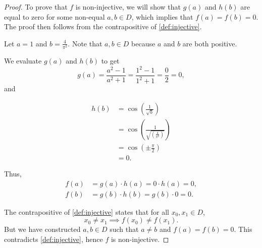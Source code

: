 \begin{enumerate}
\begin{enumerate}
\begin{proof}
                    To prove that $f$ is non-injective, we will show that $g(a)$ and $h(b)$ are equal to zero for some non-equal $a, b \in D$, which implies that $f(a) = f(b) = 0$.
                    The proof then follows from the contrapositive of \cref{def:injective}.

                    \medskip

                    Let $a = 1$ and $b = \frac{4}{\pi^2}$.
                    Note that $a, b \in D$ because $a$ and $b$ are both positive.

                    \smallskip

                    We evaluate $g(a)$ and $h(b)$ to get
                    \[
                        g(a) = \frac{a^2 - 1}{a^2 + 1} = \frac{1^2 - 1}{1^2 + 1} = \frac{0}{2} = 0,
                    \]
                    and
                    \begin{spreadlines}{\baselineskip}
                        \begin{align*}
                            h(b) &= \cos\left(\frac{1}{\sqrt{b}}\right) \\
                            &= \cos\left(\frac{1}{\sqrt{\left(\frac{4}{\pi^2}\right)}}\right) \\
                            &= \cos\left(\pm \frac{\pi}{2}\right) \\
                            &= 0.
                        \end{align*}
                    \end{spreadlines}
                    Thus,
                    \begin{align*}
                        f(a) &= g(a) \cdot h(a) = 0 \cdot h(a) = 0, \\
                        f(b) &= g(b) \cdot h(b) = g(b) \cdot 0 = 0.
                    \end{align*}

                    \smallskip

                    The contrapositive of \cref{def:injective} states that for all $x_0, x_1 \in D$,
                    \[
                        x_0 \ne x_1 \implies f(x_0) \ne f(x_1).
                    \]
                    But we have constructed $a, b \in D$ such that $a \ne b$ and $f(a) = f(b) = 0$. This contradicts \cref{def:injective}, hence $f$ is non-injective.

                    \medskip

                \end{proof}


\end{enumerate}
\end{enumerate}
